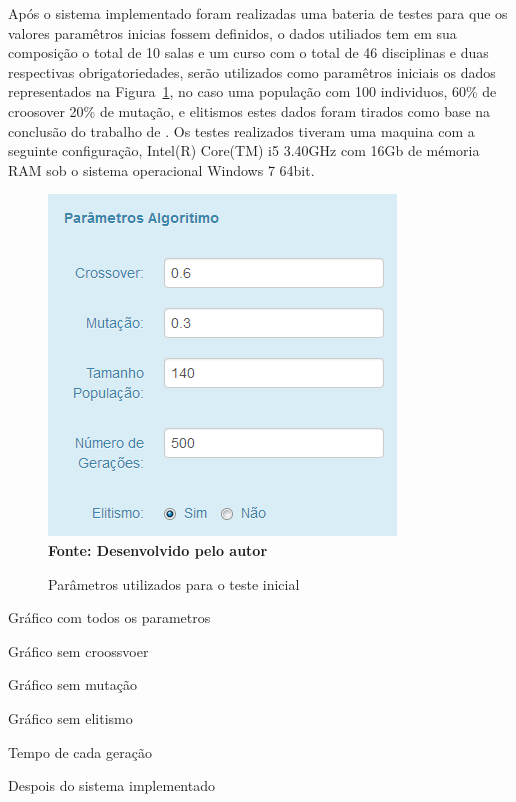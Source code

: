 

\iniciocapitulo

Após o sistema implementado foram realizadas uma bateria de testes para que os valores paramêtros inicias fossem definidos, o dados utiliados tem  em sua composição o total de 10 salas e um curso com o total de 46 disciplinas e duas respectivas obrigatoriedades, serão utilizados como paramêtros iniciais os dados representados na Figura~\ref{fig:parametrosAg}, no caso uma população com 100 individuos, 60\% de croosover 20\% de mutação, e elitismos  estes dados foram tirados como base na conclusão do trabalho de \cite{deleonardo}. Os testes realizados tiveram uma maquina com a seguinte configuração, Intel(R) Core(TM) i5 3.40GHz com 16Gb de mémoria RAM sob o sistema operacional Windows 7 64bit.\par

\begin{figure}[!htb]
\caption[Parâmetros utilizados para o teste inicial]{Parâmetros utilizados para o teste inicial}
\label{fig:parametrosAg}
\centering
\includegraphics[scale=0.5]{imagens/parametrosDoAlgoritimo.png}
\\ \textbf{\footnotesize Fonte: Desenvolvido pelo autor}
\end{figure}

Gráfico com todos os parametros

Gráfico sem croossvoer

Gráfico sem mutação

Gráfico sem elitismo

Tempo de cada geração




Despois do sistema implementado		

